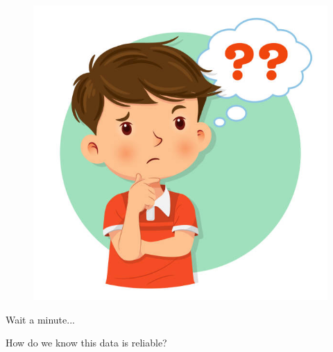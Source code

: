 \documentclass[10pt]{beamer}
\begin{document}
\begin{frame}
\begin{figure}
\includegraphics[width=1\linewidth]{wondering.jpg} 
\end{figure}
Wait a minute...

\pause
How do we know this data is reliable?
\end{frame}
\end{document}
